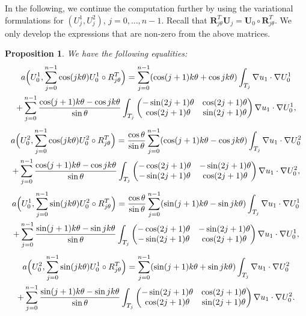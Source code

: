 \documentclass[11pt]{article}
\numberwithin{equation}{section}\newtheorem*{jepEnonce}{\jepEnonceTitle}\newenvironment{enonce*}[1]{\def\jepEnonceTitle{#1}\jepEnonce}{\endjepEnonce}\newtheorem*{conj*}{Conjecture}
\theoremstyle{plain}
\newtheorem{propo}[thm]{Proposition}
\theoremstyle{definition}
\newcommand{\bo}[1]{{\boldsymbol#1}}
\begin{document}
In the following, we continue the computation further by using the variational formulations for $(U_j^1,U_j^2)$, $j = 0,\dots,n-1$. Recall that $\bo R_{j\theta}^T \bo U_j = \bo U_0 \circ \bo R_{j\theta}^T$. We only develop the expressions that are non-zero from the above matrices.

\begin{propo}\label{prop:detailed-computations}
We have the following equalities:
\vspace*{-5pt}
\begin{multline*}
a\Bigl(U_0^1,\sum_{j=0}^{n-1} \cos(jk\theta) U_0^1 \circ R_{j\theta}^T\Bigr)
= \sum_{j=0}^{n-1} (\cos (j+1)k\theta+\cos jk\theta) \int_{T_j}\nabla u_1 \cdot \nabla U_0^1\\
+ \sum_{j=0}^{n-1} \frac{\cos(j+1)k\theta-\cos jk\theta}{\sin \theta} \int_{T_j}\begin{pmatrix}
-\sin (2j+1)\theta & \cos (2j+1) \theta \\
\cos(2j+1)\theta & \sin (2j+1)\theta
\end{pmatrix}\nabla u_1 \cdot \nabla U_0^1,
\end{multline*}
\vspace*{-5pt}
\begin{multline*}
a\Bigl(U_0^2,\sum_{j=0}^{n-1} \cos(jk\theta) U_0^2 \circ R_{j\theta}^T\Bigr)
=\frac{\cos \theta}{\sin \theta}\sum_{j=0}^{n-1} (\cos(j+1)k\theta-\cos jk\theta) \int_{T_j} \nabla u_1 \cdot \nabla U_0^2\\
+ \sum_{j=0}^{n-1} \frac{\cos(j+1)k\theta-\cos jk\theta}{\sin \theta} \int_{T_j}
\begin{pmatrix}
-\cos(2j+1)\theta & -\sin(2j+1)\theta \\
-\sin(2j+1)\theta & \cos(2j+1)\theta
\end{pmatrix}\nabla u_1 \cdot \nabla U_0^2,
\end{multline*}
\begin{multline*}
a\Bigl(U_0^1,\sum_{j=0}^{n-1} \sin(jk\theta) U_0^2 \circ R_{j\theta}^T\Bigr)
= \frac{\cos \theta}{\sin \theta}\sum_{j=0}^{n-1} (\sin(j+1)k\theta-\sin jk\theta) \int_{T_j} \nabla u_1\cdot \nabla U_0^1\\
+ \sum_{j=0}^{n-1}\dfrac{\sin(j+1)k\theta-\sin jk\theta}{\sin \theta} \int _{T_j} \begin{pmatrix}
-\cos (2j+1)\theta & -\sin (2j+1) \theta \\
-\sin (2j+1)\theta & \cos (2j+1)\theta
\end{pmatrix}\nabla u_1 \cdot \nabla U_0^1,
\end{multline*}
\begin{multline*}
a\Bigl(U_0^2,\sum_{j=0}^{n-1} \sin(jk\theta) U_0^1 \circ R_{j\theta}^T\Bigr) = \sum_{j=0}^{n-1}(\sin (j+1)k\theta + \sin jk\theta) \int_{T_j} \nabla u_1 \cdot \nabla U_0^2 \\
+ \sum_{j=0}^{n-1}\dfrac{\sin(j+1)k\theta-\sin jk\theta}{\sin \theta} \int _{T_j} \begin{pmatrix}
-\sin (2j+1)\theta & \cos (2j+1) \theta \\
\cos (2j+1)\theta & \sin (2j+1)\theta
\end{pmatrix}\nabla u_1 \cdot \nabla U_0^2.
\end{multline*}
\end{propo}
\end{document}

